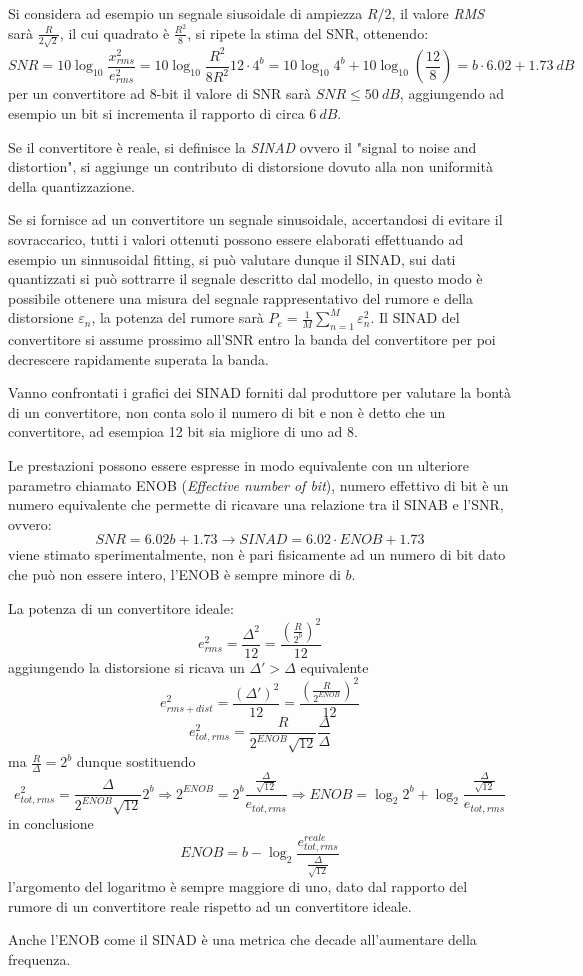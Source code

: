 Si considera ad esempio un segnale siusoidale di ampiezza $R/2$, il valore \textit{RMS} sarà $\frac{R}{2\sqrt{2}}$, il cui quadrato è $\frac{R^2}{8}$, si ripete la stima del SNR, ottenendo:
$$
SNR = 10\log_{10} \frac{x_{rms}^2}{e^2_{rms}} = 10\log_{10}\frac{R^2}{8R^2}12\cdot 4^b = 10\log_{10}4^b + 10\log_{10}(\frac{12}{8}) =
 b\cdot 6.02 + 1.73\ dB
$$
per un convertitore ad 8-bit il valore di SNR sarà $SNR \leq 50\ dB$, aggiungendo ad esempio un bit si incrementa il rapporto di circa $6\ dB$.

Se il convertitore è reale, si definisce la \textit{SINAD} ovvero il "signal to noise and distortion", si aggiunge un contributo di distorsione dovuto alla non uniformità della quantizzazione.

Se si fornisce ad un convertitore un segnale sinusoidale, accertandosi di evitare
il sovraccarico, tutti i valori ottenuti possono essere elaborati effettuando ad esempio un sinnusoidal fitting, si può valutare dunque il SINAD, sui dati 
quantizzati si può sottrarre il segnale descritto dal modello, in questo modo è possibile ottenere una misura del segnale rappresentativo del rumore e della distorsione $\varepsilon_n$, la potenza del rumore sarà
$P_e = \frac{1}{M}\sum_{n=1}^{M} \varepsilon^2_n$.
Il SINAD del convertitore si assume prossimo all'SNR entro la banda del convertitore per poi decrescere rapidamente superata la banda.

Vanno confrontati i grafici dei SINAD forniti dal produttore per valutare
la bontà di un convertitore, non conta solo il numero di bit e non è detto che un convertitore, ad esempioa 12 bit sia migliore di uno ad 8.

Le prestazioni possono essere espresse in modo equivalente con un ulteriore parametro chiamato ENOB (\textit{Effective number of bit}), numero effettivo di bit è un numero equivalente che permette di ricavare una relazione tra il SINAB e l'SNR, ovvero:
$$
SNR = 6.02b + 1.73 \rightarrow SINAD = 6.02\cdot ENOB + 1.73
$$
viene stimato sperimentalmente, non è pari fisicamente ad un numero di bit dato che può non essere intero, l'ENOB è sempre minore di $b$.

La potenza di un convertitore ideale:
$$
e^2_{rms} = \frac{\Delta^2}{12} = \frac{\left(\frac{R}{2^b}\right)^2}{12}
$$
aggiungendo la distorsione si ricava un $\Delta'>\Delta$ equivalente
$$
e^2_{rms+dist} = \frac{(\Delta')^2}{12} = \frac{\left(\frac{R}{2^{ENOB}}\right)^2}{12}
$$
$$
e^2_{tot,rms} = \frac{R}{2^{ENOB}\sqrt{12}} \frac{\Delta}{\Delta} 
$$
ma $\frac{R}{\Delta} = 2^b$ dunque sostituendo
$$
e^2_{tot,rms} = \frac{\Delta}{2^{ENOB}\sqrt{12}}2^b \Rightarrow 2^{ENOB} = 
2^b\frac{\frac{\Delta}{\sqrt{12}}}{e_{tot,rms}} \Rightarrow ENOB = \log_2 2^b + 
\log_2 \frac{\frac{\Delta}{\sqrt{12}}}{e_{tot,rms}} 
$$
in conclusione
$$
ENOB = b - \log_2 \frac{e^{reale}_{tot,rms}}{\frac{\Delta}{\sqrt{12}}}
$$
l'argomento del logaritmo è sempre maggiore di uno, dato dal rapporto del rumore
di un convertitore reale rispetto ad un convertitore ideale.

Anche l'ENOB come il SINAD è una metrica che decade all'aumentare della frequenza.

